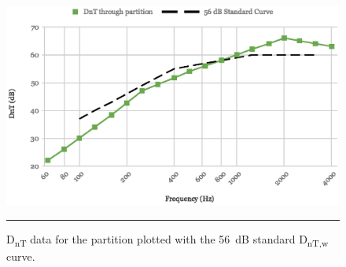\begin{figure}[htbp]
	\centering
	\includegraphics[width=\textwidth]{figures/DnTw_P.eps}
	\rule{\textwidth}{0.5pt} %
	\caption{D\textsubscript{nT} data for the partition plotted with the 56~dB standard D\textsubscript{nT,w} curve.}
	\label{fig:DnTw_partition}
\end{figure}